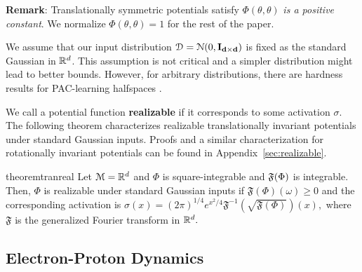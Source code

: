 {\bf Remark}: Translationally symmetric potentials satisfy
$\Phi(\theta,\theta)$ {\it is a positive constant}. We normalize
$\Phi(\theta,\theta) = 1$ for the rest of the paper.
  
We assume that our input distribution
$\mathcal{D} = \mathcal{N}(0, {\bf I_{d\times d}})$ is fixed as the
standard Gaussian in ${\mathbb{R}}^d$. This assumption is not critical and a
simpler distribution might lead to better bounds. However, for
arbitrary distributions, there are hardness results for PAC-learning
halfspaces \cite{klivans2006cryptographic}.

We call a potential function {\bf realizable} if it corresponds to
some activation $\sigma$.  The following theorem characterizes
realizable translationally invariant potentials under standard
Gaussian inputs. Proofs and a similar characterization for rotationally invariant
potentials can be found in Appendix~\ref{sec:realizable}.
%
\begin{restatable}{theorem}{tranreal}
\label{thm:tranReal}
Let $\mathcal{M} = {\mathbb{R}}^d$ and $\Phi$ is square-integrable and
${\mathfrak{F}}(\Phi)$ is integrable. Then, $\Phi$ is realizable under standard
Gaussian inputs if $\mathfrak{F}(\Phi)(\omega) \geq 0$ and the
corresponding activation is
$\sigma(x) =
(2\pi)^{1/4}e^{x^2/4}\mathfrak{F}^{-1}(\sqrt{\mathfrak{F}(\Phi)})(x),
$ where $\mathfrak{F}$ is the generalized Fourier transform in ${\mathbb{R}}^d.$
\end{restatable}
%

%
\subsection{Electron-Proton Dynamics}

%
%

